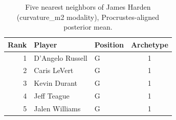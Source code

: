 \begin{table}[htbp]
  \centering\small
  \begin{tabular}{rllc}
    \toprule
    Rank & Player & Position & Archetype \\
    \midrule
    1 & D'Angelo Russell & G & 1 \\
    2 & Caris LeVert & G & 1 \\
    3 & Kevin Durant & G & 1 \\
    4 & Jeff Teague & G & 1 \\
    5 & Jalen Williams & G & 1 \\
    \bottomrule
  \end{tabular}
  \caption{Five nearest neighbors of James Harden (curvature_m2 modality), Procrustes-aligned posterior mean.}
  \label{tab:James_Harden_neighbors_curvature_m2}
\end{table}

